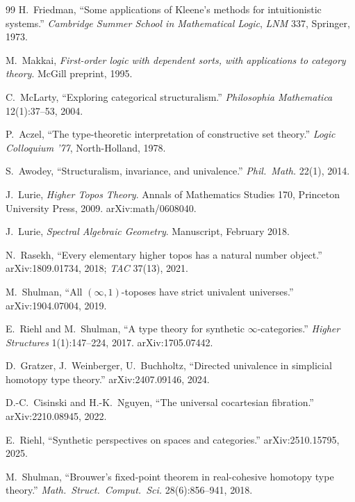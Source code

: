 \documentclass[12pt]{article}
\theoremstyle{definition}
\theoremstyle{remark}
\begin{document}
\begin{thebibliography}{99}
H.\ Friedman, ``Some applications of Kleene's methods for intuitionistic
systems.'' \emph{Cambridge Summer School in Mathematical Logic},
\emph{LNM} 337, Springer, 1973.

M.\ Makkai, \emph{First-order logic with dependent sorts, with
applications to category theory}. McGill preprint, 1995.

C.\ McLarty, ``Exploring categorical structuralism.''
\emph{Philosophia Mathematica} 12(1):37--53, 2004.

P.\ Aczel, ``The type-theoretic interpretation of constructive set
theory.'' \emph{Logic Colloquium '77}, North-Holland, 1978.

S.\ Awodey, ``Structuralism, invariance, and univalence.''
\emph{Phil.\ Math.} 22(1), 2014.


J.\ Lurie, \emph{Higher Topos Theory}. Annals of Mathematics Studies 170,
Princeton University Press, 2009. arXiv:math/0608040.

J.\ Lurie, \emph{Spectral Algebraic Geometry}. Manuscript, February 2018.

N.\ Rasekh, ``Every elementary higher topos has a natural number
object.'' arXiv:1809.01734, 2018; \emph{TAC} 37(13), 2021.

M.\ Shulman, ``All $(\infty,1)$-toposes have strict univalent universes.''
arXiv:1904.07004, 2019.


E.\ Riehl and M.\ Shulman, ``A type theory for synthetic
$\infty$-categories.''
\emph{Higher Structures} 1(1):147--224, 2017. arXiv:1705.07442.

D.\ Gratzer, J.\ Weinberger, U.\ Buchholtz, ``Directed univalence in
simplicial homotopy type theory.'' arXiv:2407.09146, 2024.

D.-C.\ Cisinski and H.-K.\ Nguyen, ``The universal cocartesian fibration.''
arXiv:2210.08945, 2022.

E.\ Riehl, ``Synthetic perspectives on spaces and categories.''
arXiv:2510.15795, 2025.


M.\ Shulman, ``Brouwer's fixed-point theorem in real-cohesive homotopy
type theory.'' \emph{Math.\ Struct.\ Comput.\ Sci.} 28(6):856--941, 2018.


\end{thebibliography}
\end{document}

